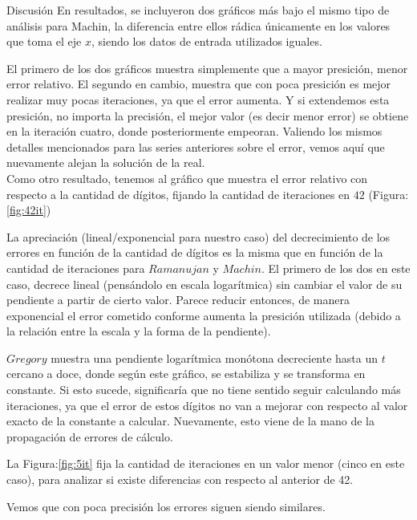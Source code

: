 \begin{section}{Discusión}
	En resultados, se incluyeron dos gráficos más bajo el mismo tipo de análisis para Machin, la diferencia entre ellos rádica únicamente en los valores que toma el eje $x$, siendo los datos de entrada utilizados iguales.
	
	El primero de los dos gráficos muestra simplemente que a mayor presición, menor error relativo. El segundo en cambio, muestra que con poca presición es mejor realizar muy pocas iteraciones, ya que el error aumenta. Y si extendemos esta presición, no importa la precisión, el mejor valor (es decir menor error) se obtiene en la iteración cuatro, donde posteriormente empeoran. Valiendo los mismos detalles mencionados para las series anteriores sobre el error, vemos aquí que nuevamente alejan la solución de la real.\\

	Como otro resultado, tenemos al gráfico que muestra el error relativo con respecto a la cantidad de dígitos, fijando la cantidad de iteraciones en $42$ (Figura:\ref{fig:42it})
	
	La apreciación (lineal/exponencial para nuestro caso) del decrecimiento de los errores en función de la cantidad de dígitos es la misma que en función de la cantidad de iteraciones para $Ramanujan$ y $Machin$. El primero de los dos en este caso, decrece lineal (pensándolo en escala logarítmica) sin cambiar el valor de su pendiente a partir de cierto valor. Parece reducir entonces, de manera exponencial el error cometido conforme aumenta la presición utilizada (debido a la relación entre la escala y la forma de la pendiente).
	
	$Gregory$ muestra una pendiente logarítmica monótona decreciente hasta un $t$ cercano a doce, donde según este gráfico, se estabiliza y se transforma en constante. Si esto sucede, significaría que no tiene sentido seguir calculando más iteraciones, ya que el error de estos dígitos no van a mejorar con respecto al valor exacto de la constante a calcular. Nuevamente, esto viene de la mano de la propagación de errores de cálculo.
	
	La Figura:\ref{fig:5it} fija la cantidad de iteraciones en un valor menor (cinco en este caso), para analizar si existe diferencias con respecto al anterior de 42.
	
	Vemos que con poca precisión los errores siguen siendo similares.
	
	

\end{section}
